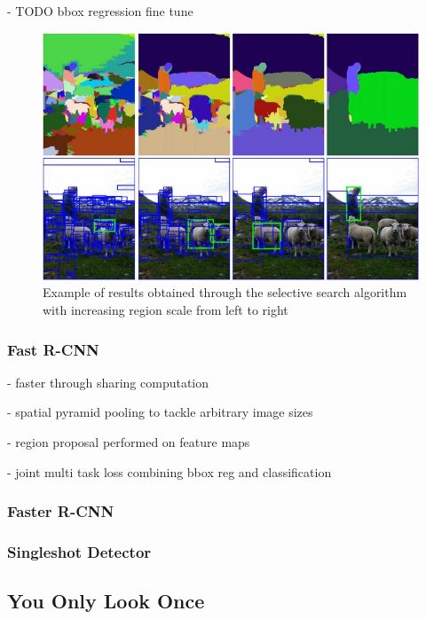 - TODO bbox regression fine tune

\begin{figure}
\begin{center}
    \includegraphics[width=13cm]{imgs/selective_search.png}
    \caption{Example of results obtained through the selective search algorithm with increasing region scale from left to right \cite{selective_search}}
    \label{fig:selective_search}
\end{center}
\end{figure}

\subsubsection{Fast R-CNN}

- faster through sharing computation

- spatial pyramid pooling to tackle arbitrary image sizes

- region proposal performed on feature maps

- joint multi task loss combining bbox reg and classification

\subsubsection{Faster R-CNN}



\subsubsection{Singleshot Detector}

\subsection{You Only Look Once}
